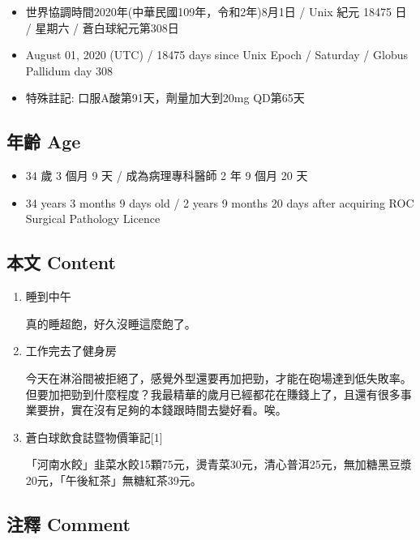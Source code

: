 \documentclass[a5paper, 11pt
]{book}
\providecommand{\tightlist}{%
  \setlength{\itemsep}{0pt}\setlength{\parskip}{0pt}}
\begin{document}
\begin{itemize}
\tightlist
\item
  世界協調時間2020年(中華民國109年，令和2年)8月1日 / Unix 紀元 18475 日
  / 星期六 / 蒼白球紀元第308日
\item
  August 01, 2020 (UTC) / 18475 days since Unix Epoch / Saturday /
  Globus Pallidum day 308
\item
  特殊註記: 口服A酸第91天，劑量加大到20mg QD第65天
\end{itemize}

\hypertarget{ux5e74ux9f61-age-53}{%
\subsection{年齡 Age}\label{ux5e74ux9f61-age-53}}

\begin{itemize}
\tightlist
\item
  34 歲 3 個月 9 天 / 成為病理專科醫師 2 年 9 個月 20 天
\item
  34 years 3 months 9 days old / 2 years 9 months 20 days after
  acquiring ROC Surgical Pathology Licence
\end{itemize}

\hypertarget{ux672cux6587-content-53}{%
\subsection{本文 Content}\label{ux672cux6587-content-53}}

\begin{enumerate}
\def\labelenumi{\arabic{enumi}.}
\item
  睡到中午

  真的睡超飽，好久沒睡這麼飽了。
\item
  工作完去了健身房

  今天在淋浴間被拒絕了，感覺外型還要再加把勁，才能在砲場達到低失敗率。但要加把勁到什麼程度？我最精華的歲月已經都花在賺錢上了，且還有很多事業要拚，實在沒有足夠的本錢跟時間去變好看。唉。
\item
  蒼白球飲食誌暨物價筆記{[}1{]}

  「河南水餃」韭菜水餃15顆75元，燙青菜30元，清心普洱25元，無加糖黑豆漿20元，「午後紅茶」無糖紅茶39元。
\end{enumerate}

\hypertarget{ux6ce8ux91cb-comment-53}{%
\subsection{注釋 Comment}\label{ux6ce8ux91cb-comment-53}}
\end{document}

